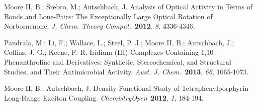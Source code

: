 \documentclass[12pt,letterpaper,oneside]{article}
\begin{document}
\begin{etaremune}
	\item Moore II, B.; Srebro, M.; Autschbach, J. Analysis of Optical Activity in Terms of Bonds and Lone-Pairs: The Exceptionally Large Optical Rotation of Norbornenone. \textit{J. Chem. Theory Comput.}\ \textbf{2012}, \textit{8}, 4336-4346.
	\item Pandrala, M.; Li, F.; Wallace, L.; Steel, P. J.; Moore II, B.; Autschbach, J.; Collins, J. G.; Keene, F. R. Iridium (III) Complexes Containing 1,10-Phenanthroline and Derivatives: Synthetic, Stereochemical, and Structural Studies, and Their Antimicrobial Activity. \textit{Aust. J. Chem.}\ \textbf{2013}, \textit{66}, 1065-1073.
	\item Moore II, B.; Autschbach, J. Density Functional Study of Tetraphenylporphyrin Long-Range Exciton Coupling. \textit{ChemistryOpen}\ \textbf{2012}, \textit{1}, 184-194.
\end{etaremune}
\end{document}

